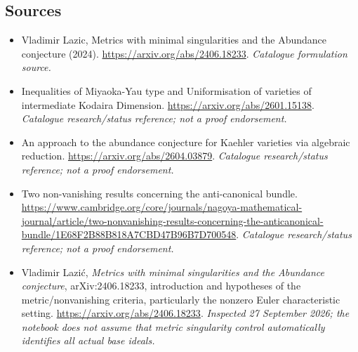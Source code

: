 \documentclass[11pt,a4paper]{article}
\numberwithin{equation}{section}
\begin{document}
\subsection{Sources}
\begin{itemize}\raggedright
\item[\textnormal{[S1]}]\hypertarget{source:statement:1}{} Vladimir Lazic, Metrics with minimal singularities and the Abundance conjecture (2024).
\url{https://arxiv.org/abs/2406.18233}.
{\small\textit{Catalogue formulation source.}}
\item[\textnormal{[S2]}]\hypertarget{source:statement:2}{} Inequalities of Miyaoka-Yau type and Uniformisation of varieties of intermediate Kodaira Dimension.
\url{https://arxiv.org/abs/2601.15138}.
{\small\textit{Catalogue research/status reference; not a proof endorsement.}}
\item[\textnormal{[S3]}]\hypertarget{source:statement:3}{} An approach to the abundance conjecture for Kaehler varieties via algebraic reduction.
\url{https://arxiv.org/abs/2604.03879}.
{\small\textit{Catalogue research/status reference; not a proof endorsement.}}
\item[\textnormal{[S4]}]\hypertarget{source:statement:4}{} Two non-vanishing results concerning the anti-canonical bundle.
\url{https://www.cambridge.org/core/journals/nagoya-mathematical-journal/article/two-nonvanishing-results-concerning-the-anticanonical-bundle/1E68F2B88B818A7CBD47B96B7D700548}.
{\small\textit{Catalogue research/status reference; not a proof endorsement.}}
\item[\textnormal{[E1]}]\hypertarget{extra:statement:1}{} Vladimir Lazi\'c,
\emph{Metrics with minimal singularities and the Abundance conjecture},
arXiv:2406.18233, introduction and hypotheses of the metric/nonvanishing
criteria, particularly the nonzero Euler characteristic setting.
\url{https://arxiv.org/abs/2406.18233}.
{\small\textit{Inspected 27 September 2026; the notebook does not assume
that metric singularity control automatically identifies all actual base ideals.}}
\end{itemize}
\end{document}
